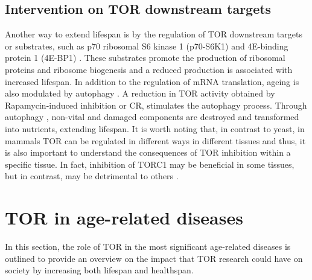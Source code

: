 \subsection{Intervention on TOR downstream targets}
\label{subsec:Intervention on TOR downstream targets}
Another way to extend lifespan is by the regulation of TOR downstream targets or substrates, such as p70 ribosomal S6 kinase 1 (p70-S6K1) \citep{Selman2009} and 4E-binding protein 1 (4E-BP1) \citep{Kapahi2009}. These substrates promote the production of ribosomal proteins and ribosome biogenesis and a reduced production is associated with increased lifespan. In addition to the regulation of mRNA translation, ageing is also modulated by autophagy \citep{Cuervo2008, Blagosklonny2009, Hansen2008, Blagosklonny2010}. A reduction in TOR activity obtained by Rapamycin-induced inhibition or CR, stimulates the autophagy process. Through autophagy \citep{Alvers2009}, non-vital and damaged components are destroyed and transformed into nutrients, extending lifespan. It is worth noting that, in contrast to yeast, in mammals TOR can be regulated in different ways in different tissues and thus, it is also important to understand the consequences of TOR inhibition within a specific tissue. In fact, inhibition of TORC1 may 
be beneficial in some tissues, but in contrast, may be detrimental to others \citep{Russell2011}.


\section{TOR in age-related diseases}
\label{sec:TOR in age-related diseases}
In this section, the role of TOR in the most significant age-related diseases is outlined to provide an overview on the impact that TOR research could have on society by increasing both lifespan and healthspan.

